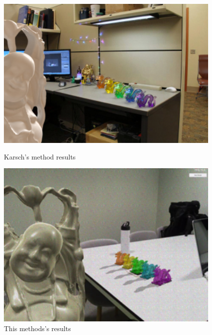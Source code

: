 \begin{figure}[H]
    \centering
    \begin{minipage}{0.475\textwidth}
        \centering
        \includegraphics[width=0.99\textwidth]{Figures/budaDragonKarsch.png} %
        \caption{Karsch's method results}
    \end{minipage}\hfill
    \begin{minipage}{0.475\textwidth}
        \centering
        \includegraphics[width=0.99\textwidth]{Figures/budaDragon.png} %
        \caption{This methods's results}
    \end{minipage}
\end{figure}

